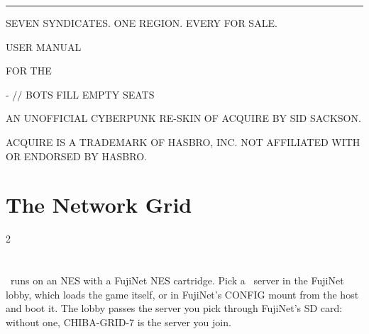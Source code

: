 \documentclass[12pt,letterpaper]{article}
\begin{document}
\begin{titlepage}
\machine
\vspace*{1.6in}
{\color{amber}\rule{\linewidth}{2pt}}\par\vspace{14pt}
{\fontsize{44}{48}\selectfont \game\par}\vspace{10pt}
{\fontsize{12}{16}\selectfont\color{steel} SEVEN SYNDICATES. ONE REGION. EVERY \MakeUppercase{} FOR SALE.\par}
\vspace{14pt}{\color{amber}\rule{\linewidth}{2pt}}\par
\vspace{0.35in}
{\fontsize{24}{30}\selectfont USER MANUAL\par}\vspace{4pt}
{\fontsize{14}{18}\selectfont\color{amber} FOR THE \MakeUppercase{\PlatformLong}\par}
\vspace{0.4in}
{\fontsize{12}{16}\selectfont \PlatformMachines\par
{}- \MakeUppercase{} \quad // \quad BOTS FILL EMPTY SEATS\par}
\vfill
{\fontsize{8.5}{11}\selectfont\color{steel}
AN UNOFFICIAL CYBERPUNK RE-SKIN OF ACQUIRE BY SID SACKSON.\par
ACQUIRE IS A TRADEMARK OF HASBRO, INC. NOT AFFILIATED WITH OR ENDORSED BY HASBRO.\par}
\end{titlepage}

\renewcommand{\secstatus}{THE SETTING \quad // \quad THE OBJECT \quad // \quad THE END}
\chapter{The Network Grid}
\begin{multicols}{2}
\end{multicols}

\renewcommand{\secstatus}{REGION \quad // \quad STATUS \quad // \quad HANDLE}
\chapter{}
\game\ runs on an NES with a FujiNet NES cartridge. Pick a \game\ server in the FujiNet
lobby, which loads the game itself, or in FujiNet's CONFIG mount  from the host
 and boot it. The lobby passes the server you pick through FujiNet's SD card: without
one, CHIBA-GRID-7 is the server you join.
\end{document}
